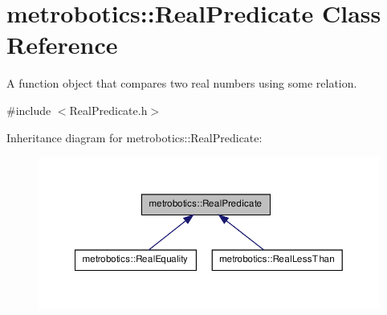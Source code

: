 \hypertarget{classmetrobotics_1_1RealPredicate}{\section{metrobotics\-:\-:\-Real\-Predicate \-Class \-Reference}
\label{classmetrobotics_1_1RealPredicate}
}


\-A function object that compares two real numbers using some relation.  




{\ttfamily \#include $<$\-Real\-Predicate.\-h$>$}



\-Inheritance diagram for metrobotics\-:\-:\-Real\-Predicate\-:
\nopagebreak
\begin{figure}[H]
\begin{center}
\leavevmode
\includegraphics[width=350pt]{classmetrobotics_1_1RealPredicate__inherit__graph}
\end{center}
\end{figure}
